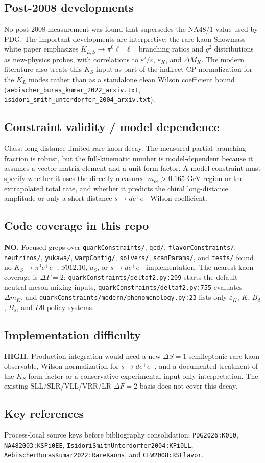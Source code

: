 \subsection*{Post-2008 developments}
No post-2008 measurement was found that supersedes the NA48/1 value used by
PDG.  The important developments are interpretive: the rare-kaon Snowmass
white paper emphasizes \(K_{L,S}\to\pi^0\ell^+\ell^-\) branching ratios and
\(q^2\) distributions as new-physics probes, with correlations to
\(\varepsilon'/\varepsilon\), \(\varepsilon_K\), and \(\Delta M_K\).  The
modern literature also treats this \(K_S\) input as part of the indirect-CP
normalization for the \(K_L\) modes rather than as a standalone clean Wilson
coefficient bound (\texttt{aebischer\_buras\_kumar\_2022\_arxiv.txt},
\texttt{isidori\_smith\_unterdorfer\_2004\_arxiv.txt}).

\subsection*{Constraint validity / model dependence}
Class: long-distance-limited rare kaon decay.  The measured partial branching
fraction is robust, but the full-kinematic number is model-dependent because
it assumes a vector matrix element and a unit form factor.  A model constraint
must specify whether it uses the directly measured \(m_{ee}>0.165\) GeV region
or the extrapolated total rate, and whether it predicts the chiral
long-distance amplitude or only a short-distance \(s\to d e^+e^-\) Wilson
coefficient.

\subsection*{Code coverage in this repo}
\textbf{NO.}  Focused greps over \texttt{quarkConstraints/}, \texttt{qcd/},
\texttt{flavorConstraints/}, \texttt{neutrinos/}, \texttt{yukawa/},
\texttt{warpConfig/}, \texttt{solvers/}, \texttt{scanParams/}, and
\texttt{tests/} found no \(K_S\to\pi^0 e^+e^-\), \(S012.10\),
\(a_S\), or \(s\to d e^+e^-\) implementation.  The nearest kaon coverage is
\(\Delta F=2\): \texttt{quarkConstraints/deltaf2.py:209} starts the default
neutral-meson-mixing inputs, \texttt{quarkConstraints/deltaf2.py:755}
evaluates \(\Delta m_K\), and
\texttt{quarkConstraints/modern/phenomenology.py:23} lists only
\(\varepsilon_K\), \(K\), \(B_d\), \(B_s\), and \(D0\) policy systems.

\subsection*{Implementation difficulty}
\textbf{HIGH.}  Production integration would need a new \(\Delta S=1\)
semileptonic rare-kaon observable, Wilson normalization for \(s\to d e^+e^-\),
and a documented treatment of the \(K_S\) form factor or a conservative
experimental-input-only interpretation.  The existing SLL/SLR/VLL/VRR/LR
\(\Delta F=2\) basis does not cover this decay.

\subsection*{Key references}
Process-local source keys before bibliography consolidation:
\texttt{PDG2026:K010}, \texttt{NA482003:KSPi0EE},
\texttt{IsidoriSmithUnterdorfer2004:KPi0LL},
\texttt{AebischerBurasKumar2022:RareKaons}, and
\texttt{CFW2008:RSFlavor}.
